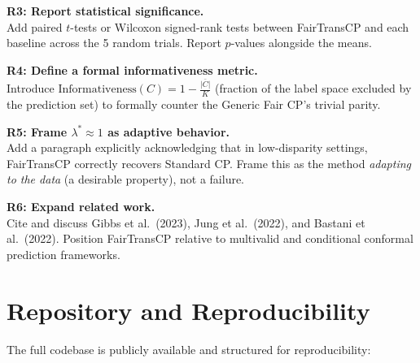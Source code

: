 \documentclass[11pt,a4paper]{article}
\begin{document}
\begin{recommendbox}
\textbf{R3: Report statistical significance.} \\
Add paired $t$-tests or Wilcoxon signed-rank tests between FairTransCP and each baseline across the 5 random trials. Report $p$-values alongside the means.
\end{recommendbox}

\begin{recommendbox}
\textbf{R4: Define a formal informativeness metric.} \\
Introduce $\text{Informativeness}(C) = 1 - \frac{\bar{|C|}}{K}$ (fraction of the label space excluded by the prediction set) to formally counter the Generic Fair CP's trivial parity.
\end{recommendbox}

\begin{recommendbox}
\textbf{R5: Frame $\lambda^* \approx 1$ as adaptive behavior.} \\
Add a paragraph explicitly acknowledging that in low-disparity settings, FairTransCP correctly recovers Standard CP. Frame this as the method \emph{adapting to the data} (a desirable property), not a failure.
\end{recommendbox}

\begin{recommendbox}
\textbf{R6: Expand related work.} \\
Cite and discuss Gibbs et al.\ (2023), Jung et al.\ (2022), and Bastani et al.\ (2022). Position FairTransCP relative to multivalid and conditional conformal prediction frameworks.
\end{recommendbox}

\section{Repository and Reproducibility}
\label{sec:repo}

The full codebase is publicly available and structured for reproducibility:
\end{document}
